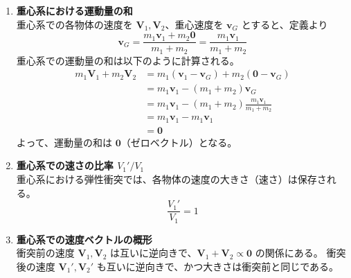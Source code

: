 \documentclass[a4paper,12pt]{jlreq}
\begin{document}
\begin{enumerate}[label=(\alph*)]
    \item \textbf{重心系における運動量の和} \\
    重心系での各物体の速度を $\bm{V}_1, \bm{V}_2$、重心速度を $\bm{v}_G$ とすると、定義より
    \[
    \bm{v}_G = \frac{m_1 \bm{v}_1 + m_2 \bm{0}}{m_1 + m_2} = \frac{m_1 \bm{v}_1}{m_1 + m_2}
    \]
    重心系での運動量の和は以下のように計算される。
    \begin{align*}
    m_1 \bm{V}_1 + m_2 \bm{V}_2 &= m_1 (\bm{v}_1 - \bm{v}_G) + m_2 (\bm{0} - \bm{v}_G) \\
    &= m_1 \bm{v}_1 - (m_1 + m_2) \bm{v}_G \\
    &= m_1 \bm{v}_1 - (m_1 + m_2) \frac{m_1 \bm{v}_1}{m_1 + m_2} \\
    &= m_1 \bm{v}_1 - m_1 \bm{v}_1 \\
    &= \bm{0}
    \end{align*}
    よって、運動量の和は $\bm{0}$（ゼロベクトル）となる。

    \item \textbf{重心系での速さの比率 $V_1'/V_1$} \\
    重心系における弾性衝突では、各物体の速度の大きさ（速さ）は保存される。
    \[
    \frac{V_1'}{V_1} = 1
    \]

    \item \textbf{重心系での速度ベクトルの概形} \\
    衝突前の速度 $\bm{V}_1, \bm{V}_2$ は互いに逆向きで、$\bm{V}_1 + \bm{V}_2 \propto \bm{0}$ の関係にある。
    衝突後の速度 $\bm{V}_1', \bm{V}_2'$ も互いに逆向きで、かつ大きさは衝突前と同じである。
    
    \begin{center}
    \end{center}
\end{enumerate}
\end{document}

